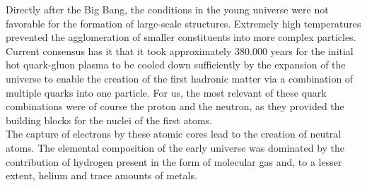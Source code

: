     Directly after the Big Bang, the conditions in the young universe were not favorable for the
    formation of large-scale structures. Extremely high temperatures prevented the agglomeration 
    of smaller constituents into more complex particles. \\

    Current consensus has it that it took approximately 380.000 years for
    the initial hot quark-gluon plasma to be cooled down sufficiently by 
    the expansion of the universe to enable 
    the creation of the first hadronic matter via 
    a combination of multiple quarks into one particle. 
    For us, the most relevant of these quark combinations were of course the proton and the neutron,
    as they provided the building blocks for the nuclei of the first atoms. \\

    The capture of electrons by these atomic cores lead to the creation of neutral atoms. 
    The elemental composition of the early universe was dominated by the contribution 
    of hydrogen present in the form of molecular gas and, to a lesser extent, 
    helium and trace amounts of metals. 



    







    


